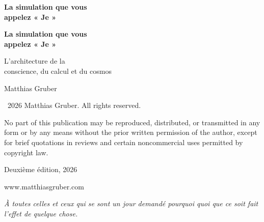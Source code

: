 \documentclass[11pt, twoside, openright]{book}
\makeatletter
\def\cleardoublepage{\clearpage\if@twoside \ifodd\c@page\else
  \thispagestyle{empty}\hbox{}\newpage
  \if@twocolumn\hbox{}\newpage\fi\fi\fi}
\makeatother
\begin{document}
\frontmatter
\pagestyle{empty}

\vspace*{3in}
\begin{center}
{\Huge\bfseries La simulation que vous\\[0.3cm] appelez « Je »\par}
\end{center}
\cleardoublepage

\vspace*{2in}
\begin{center}
{\Huge\bfseries La simulation que vous\\[0.3cm] appelez « Je »\par}
\vspace{0.8cm}
{\Large L'architecture de la\\[0.2cm] conscience, du calcul et du cosmos\par}
\vspace{2cm}
{\large Matthias Gruber\par}
\end{center}
\clearpage

\thispagestyle{empty}
\vspace*{\fill}
{\small
\noindent \textcopyright\ 2026 Matthias Gruber. All rights reserved.\par
\vspace{0.5cm}
\noindent No part of this publication may be reproduced, distributed, or transmitted
in any form or by any means without the prior written permission of the author,
except for brief quotations in reviews and certain noncommercial uses
permitted by copyright law.\par
\vspace{0.5cm}

\vspace{0.5cm}
\noindent Deuxième édition, 2026\par
\vspace{0.5cm}
\noindent www.matthiasgruber.com\par
}
\cleardoublepage

\thispagestyle{empty}
\vspace*{3in}
\begin{center}
\textit{À toutes celles et ceux qui se sont un jour demandé pourquoi quoi que ce soit fait l'effet de quelque chose.}
\end{center}
\cleardoublepage
\end{document}
